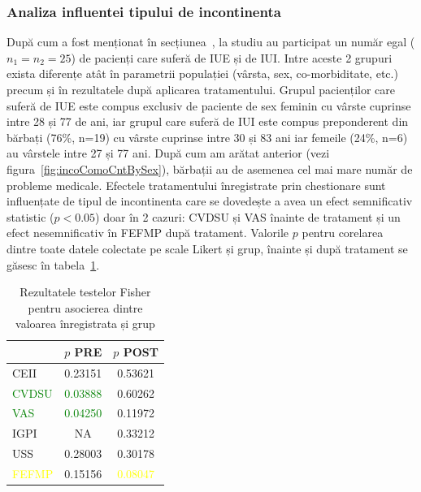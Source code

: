 \documentclass[12pt,draft]{article}
\begin{document}
\subsubsection{Analiza influentei tipului de incontinenta}
 După cum a fost menționat în secțiunea~, la studiu au participat un număr egal ($n_1=n_2=25$) de pacienți care suferă de \ac{IUE} și de \ac{IUI}. Intre aceste 2 grupuri exista diferențe atât în parametrii populației (vârsta, sex, co-morbiditate, etc.) precum și în rezultatele după aplicarea tratamentului. Grupul pacienților care suferă de \ac{IUE} este compus exclusiv de paciente de sex feminin cu vârste cuprinse intre 28 și 77 de ani, iar grupul care suferă de \ac{IUI} este compus preponderent din bărbați (76\%, n=19) cu vârste cuprinse intre 30 și 83 ani iar femeile (24\%, n=6) au vârstele intre 27 și 77 ani. După cum am arătat anterior (vezi figura~\ref{fig:incoComoCntBySex}), bărbații au de asemenea cel mai mare număr de probleme medicale.
Efectele tratamentului înregistrate prin chestionare sunt influențate de tipul de incontinenta care se dovedește a avea un efect semnificativ statistic ($p<0.05$) doar în 2 cazuri: \ac{CVDSU} și \ac{VAS} înainte de tratament și un efect nesemnificativ în \ac{FEFMP} după tratament. Valorile $p$ pentru corelarea dintre toate datele colectate pe scale Likert și grup, înainte și după tratament se găsesc în tabela~\ref{tab:resFisherGroup}. 
 \begin{table}[H]
	\centering
	\begin{tabular}{|l|c|c|} \hline
	   																	& $p$ PRE 													& $p$ POST \\ \hline
		CEII 														& 0.23151 													& 0.53621 \\ \hline
		\textcolor{green}{CVDSU} 	& \textcolor{green}{0.03888} 	& 0.60262 \\ \hline
		\textcolor{green}{VAS} 			& \textcolor{green}{0.04250} 	& 0.11972 \\ \hline
		IGPI 														& NA 																&  0.33212 \\ \hline
		USS 															& 0.28003 													& 0.30178 \\ \hline
		\textcolor{yellow}{FEFMP} 	& 0.15156 													& \textcolor{yellow}{0.08047} \\ \hline
	\end{tabular}
	\caption{Rezultatele testelor Fisher pentru asocierea dintre valoarea înregistrata și grup} 
	\label{tab:resFisherGroup}
\end{table}
%
\end{document}
